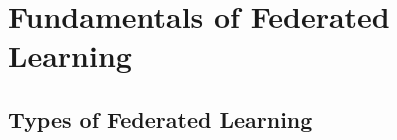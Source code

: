 \section{Fundamentals of Federated Learning\label{sec:bg.fl}}






\subsection{Types of Federated Learning\label{sec:bg.fl.types}}


